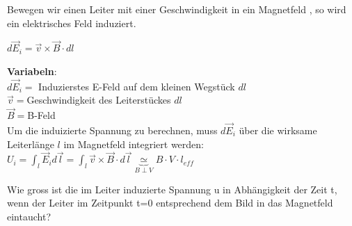 \newpage

\begingl
Bewegen wir einen Leiter mit einer Geschwindigkeit in ein Magnetfeld , so wird ein elektrisches Feld induziert.

\formulaBegin
$ \displaystyle d\vec{E}_i = \vec{v} \times \vec{B}  \cdot dl$
\formulaEnd

\textbf{Variabeln}: \\
$ d\vec{E}_i =$ Induzierstes E-Feld auf dem kleinen Wegstück $dl$ \\
$ \vec{v} = $Geschwindigkeit des Leiterstückes $ dl $ \\
$ \vec{B} = $B-Feld \\

Um die induizierte Spannung zu berechnen, muss $d\vec{E}_i$ über die wirksame Leiterlänge $l$ im Magnetfeld  integriert werden: \\
\formulaBegin
$\displaystyle U_{i} = \int_l  \vec{E}_i d\vec{l}= \int_l \vec{v} \times \vec{B}  \cdot d\vec{l} \underbrace{\simeq}_{B \perp V} B \cdot V \cdot l_{eff}$
\formulaEnd

\iend



\beginbsp
  Wie gross ist die im Leiter induzierte Spannung u in Abhängigkeit der Zeit t, wenn der Leiter im Zeitpunkt t=0 entsprechend dem Bild in das Magnetfeld eintaucht?
\begin{center}
\end{center}
\iend
\newpage




